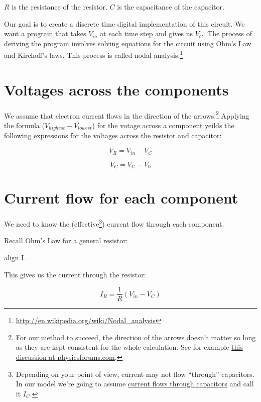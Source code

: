 \documentclass{article}
\newcommand{\boxedeq}[2]{\begin{empheq}[box={\fboxsep=6pt\fbox}]{align}\label{#1}#2\end{empheq}}
\begin{document}
$R$ is the resistance of the resistor.
$C$ is the capacitance of the capacitor.

Our goal is to create a discrete time digital implementation of this circuit.
We want a program that takes $V_{in}$ at each time step and gives us $V_{C}$.
The process of deriving the program involves solving equations for
the circuit using Ohm's Law and Kirchoff's laws. This process is called nodal analysis.\footnote{\url{http://en.wikipedia.org/wiki/Nodal_analysis}}


\section{Voltages across the components}

We assume that electron current flows in the direction of the arrows.\footnote{For our method to succeed, the direction of the arrows doesn't matter so long as they are kept consistent for the whole calculation. See for example \href{https://www.physicsforums.com/threads/node-voltage-analysis.246884/}{this discussion at physicsforums.com}.}
Applying the formula ($V_{highest} - V_{lowest}$) for the votage across a component yeilds the following expressions for the voltages across the resistor and capacitor:

\begin{equation}
V_R = V_{in} - V_C
\end{equation}

\begin{equation}
V_C = V_C - V_0
\end{equation}


\section{Current flow for each component}

We need to know the (effective\footnote{Depending on your point of view, current may not flow ``through''
	capacitors. In our model we're going to assume
	\href{https://www.youtube.com/watch?v=ppWBwZS4e7A}{current flows
		through capacitors} and call it $I_C$.}) current flow through each component.

Recall Ohm's Law for a general resistor:

\boxedeq{}{
	I=
}

This gives us the current through the resistor:

\begin{equation}
\label{eqn:I_R1}
I_R = \frac{1}{R}(V_{in} - V_C)
\end{equation}
\end{document}

